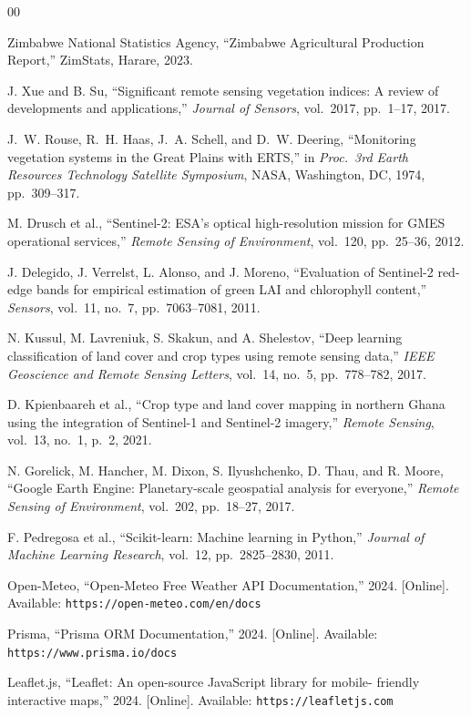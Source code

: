 \documentclass[conference]{IEEEtran}
\begin{document}
\begin{thebibliography}{00}

Zimbabwe National Statistics Agency, ``Zimbabwe Agricultural Production
Report,'' ZimStats, Harare, 2023.

J. Xue and B. Su, ``Significant remote sensing vegetation indices: A
review of developments and applications,'' \textit{Journal of Sensors},
vol.~2017, pp.~1--17, 2017.

J.~W. Rouse, R.~H. Haas, J.~A. Schell, and D.~W. Deering, ``Monitoring
vegetation systems in the Great Plains with ERTS,'' in \textit{Proc.\
3rd Earth Resources Technology Satellite Symposium}, NASA, Washington,
DC, 1974, pp.~309--317.

M. Drusch et al., ``Sentinel-2: ESA's optical high-resolution mission
for GMES operational services,'' \textit{Remote Sensing of Environment},
vol.~120, pp.~25--36, 2012.

J. Delegido, J. Verrelst, L. Alonso, and J. Moreno, ``Evaluation of
Sentinel-2 red-edge bands for empirical estimation of green LAI and
chlorophyll content,'' \textit{Sensors}, vol.~11, no.~7,
pp.~7063--7081, 2011.

N. Kussul, M. Lavreniuk, S. Skakun, and A. Shelestov, ``Deep learning
classification of land cover and crop types using remote sensing data,''
\textit{IEEE Geoscience and Remote Sensing Letters}, vol.~14, no.~5,
pp.~778--782, 2017.

D. Kpienbaareh et al., ``Crop type and land cover mapping in northern
Ghana using the integration of Sentinel-1 and Sentinel-2 imagery,''
\textit{Remote Sensing}, vol.~13, no.~1, p.~2, 2021.

N. Gorelick, M. Hancher, M. Dixon, S. Ilyushchenko, D. Thau, and
R. Moore, ``Google Earth Engine: Planetary-scale geospatial analysis for
everyone,'' \textit{Remote Sensing of Environment}, vol.~202,
pp.~18--27, 2017.

F. Pedregosa et al., ``Scikit-learn: Machine learning in Python,''
\textit{Journal of Machine Learning Research}, vol.~12,
pp.~2825--2830, 2011.

Open-Meteo, ``Open-Meteo Free Weather API Documentation,'' 2024.
[Online]. Available: \texttt{https://open-meteo.com/en/docs}

Prisma, ``Prisma ORM Documentation,'' 2024. [Online]. Available:
\texttt{https://www.prisma.io/docs}

Leaflet.js, ``Leaflet: An open-source JavaScript library for mobile-
friendly interactive maps,'' 2024. [Online]. Available:
\texttt{https://leafletjs.com}

\end{thebibliography}
\end{document}
